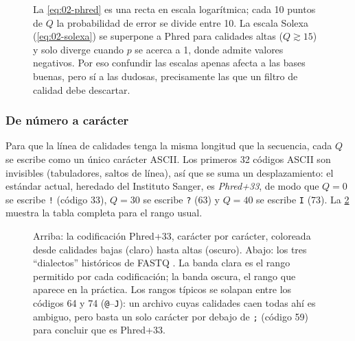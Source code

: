 \begin{figure}[t]
\centering
{}
\caption[Escalas Phred y Solexa]{La \cref{eq:02-phred} es una recta en escala logarítmica; cada 10 puntos de $Q$ la probabilidad de error se divide entre 10. La escala Solexa (\cref{eq:02-solexa}) se superpone a Phred para calidades altas ($Q\gtrsim15$) y solo diverge cuando $p$ se acerca a 1, donde admite valores negativos. Por eso confundir las escalas apenas afecta a las bases buenas, pero sí a las dudosas, precisamente las que un filtro de calidad debe descartar.}
\label{fig:02-phred}
\end{figure}

\subsubsection{De número a carácter}

Para que la línea de calidades tenga la misma longitud que la secuencia, cada $Q$ se escribe como un único carácter ASCII. Los primeros 32 códigos ASCII son invisibles (tabuladores, saltos de línea), así que se suma un desplazamiento: el estándar actual, heredado del Instituto Sanger, es \emph{Phred+33}, de modo que $Q=0$ se escribe \texttt{!} (código 33), $Q=30$ se escribe \texttt{?} (63) y $Q=40$ se escribe \texttt{I} (73). La \cref{fig:02-ascii} muestra la tabla completa para el rango usual.

\begin{figure}[t]
\centering

\caption[Codificación ASCII de las calidades]{Arriba: la codificación Phred+33, carácter por carácter, coloreada desde calidades bajas (claro) hasta altas (oscuro). Abajo: los tres ``dialectos'' históricos de FASTQ \parencite{c02-cock2010}. La banda clara es el rango permitido por cada codificación; la banda oscura, el rango que aparece en la práctica. Los rangos típicos se solapan entre los códigos 64 y 74 (\texttt{@}–\texttt{J}): un archivo cuyas calidades caen todas ahí es ambiguo, pero basta un solo carácter por debajo de \texttt{;} (código 59) para concluir que es Phred+33.}
\label{fig:02-ascii}
\end{figure}

